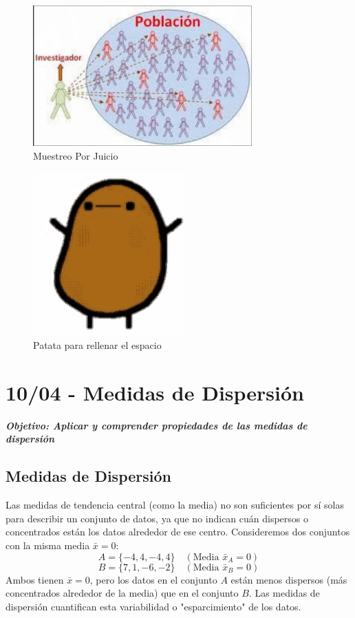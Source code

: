 \documentclass[12pt, letterpaper]{article}
\begin{document}
\begin{figure}[htbp]
    \centering
    \includegraphics[width=0.75\textwidth]{MPJ}
    \caption{Muestreo Por Juicio}
    \label{fig:MPJ}
\end{figure}

\begin{figure}[htbp]
    \centering
    \includegraphics[width=0.35\linewidth]{patata}
    \caption{Patata para rellenar el espacio}
    \label{fig:patata}
\end{figure}
\newpage

\section{10/04 - Medidas de Dispersión}
\textbf{\textit{Objetivo: Aplicar y comprender propiedades de las medidas de dispersión}}
\subsection{Medidas de Dispersión}
Las medidas de tendencia central (como la media) no son suficientes por sí solas para describir un conjunto de datos, ya que no indican cuán dispersos o concentrados están los datos alrededor de ese centro. Consideremos dos conjuntos con la misma media $\bar{x}=0$:
\[ A = \{-4, 4, -4, 4\} \quad (\text{Media } \bar{x}_A = 0) \]
\[ B = \{7, 1, -6, -2\} \quad (\text{Media } \bar{x}_B = 0) \]
Ambos tienen $\bar{x}=0$, pero los datos en el conjunto $A$ están menos dispersos (más concentrados alrededor de la media) que en el conjunto $B$. Las medidas de dispersión cuantifican esta variabilidad o "esparcimiento" de los datos.
\end{document}
